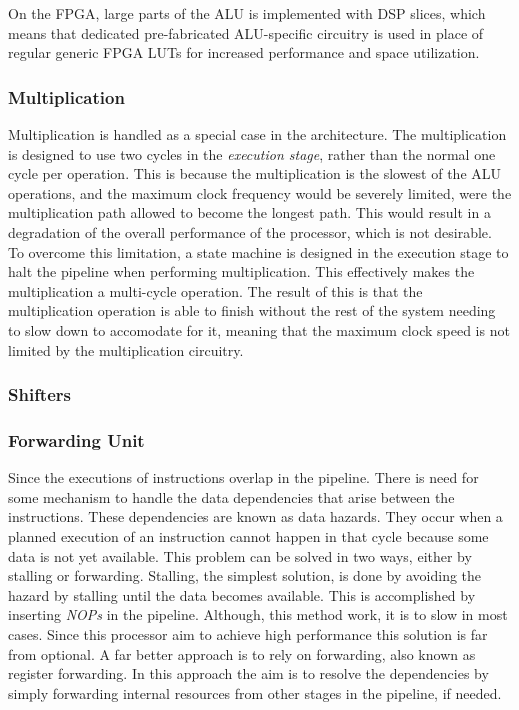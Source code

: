 On the FPGA, large parts of the ALU is implemented with \glspl{DSP slice}, which means that dedicated pre-fabricated ALU-specific circuitry is used in place of regular generic \gls{FPGA} \glspl{LUT} for increased performance and space utilization.

\subsubsection{Multiplication}

Multiplication is handled as a special case in the architecture.
The multiplication is designed to use two cycles in the \emph{execution stage}, rather than the normal one cycle per operation.
This is because the multiplication is the slowest of the ALU operations, and the maximum clock frequency would be severely limited, were the multiplication path allowed to become the longest path.
This would result in a degradation of the overall performance of the processor, which is not desirable.
To overcome this limitation, a state machine is designed in the execution stage to halt the pipeline when performing multiplication.
This effectively makes the multiplication a multi-cycle operation.
The result of this is that the multiplication operation is able to finish without the rest of the system needing to slow down to accomodate for it, meaning that the maximum clock speed is not limited by the multiplication circuitry.

\subsubsection{Shifters}



\subsubsection{Forwarding Unit} \label{fpga:fitness:sss:forwarding_unit}
Since the executions of instructions overlap in the pipeline.
There is need for some mechanism to handle the data dependencies that arise between the instructions. These dependencies are known as data hazards. They occur when a planned execution of an instruction cannot happen in that cycle because some data is not yet available. This problem can be solved in two ways, either by stalling or forwarding. Stalling, the simplest solution, is done by avoiding the hazard by stalling until the data becomes available. This is accomplished by inserting \emph{NOPs} in the pipeline. Although, this method work, it is to slow in most cases. Since this processor aim to achieve high performance this solution is far from optional. A far better approach is to rely on forwarding, also known as register forwarding. In this approach the aim is to resolve the dependencies by simply forwarding internal resources from other stages in the pipeline, if needed.

